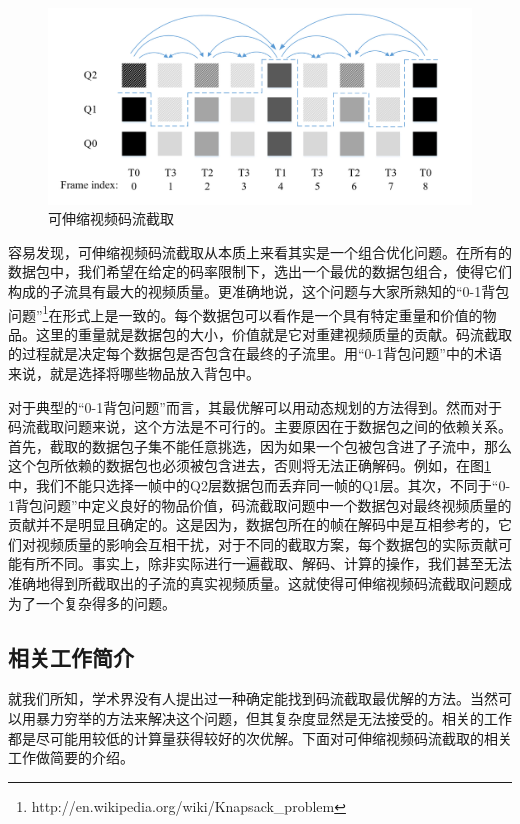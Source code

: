\begin{figure}[h]
\centering
\includegraphics[width = 0.9\linewidth]{./figures/Bitstream-Extraction.jpg}
\caption{可伸缩视频码流截取\label{fig:Bitstream-Extraction}}
\end{figure}

容易发现，可伸缩视频码流截取从本质上来看其实是一个组合优化问题。在所有的数据包中，我们希望在给定的码率限制下，选出一个最优的数据包组合，使得它们构成的子流具有最大的视频质量。更准确地说，这个问题与大家所熟知的“0-1背包问题”\footnote{http://en.wikipedia.org/wiki/Knapsack\_problem}在形式上是一致的。每个数据包可以看作是一个具有特定重量和价值的物品。这里的重量就是数据包的大小，价值就是它对重建视频质量的贡献。码流截取的过程就是决定每个数据包是否包含在最终的子流里。用“0-1背包问题”中的术语来说，就是选择将哪些物品放入背包中。

对于典型的“0-1背包问题”而言，其最优解可以用动态规划的方法得到。然而对于码流截取问题来说，这个方法是不可行的。主要原因在于数据包之间的依赖关系。首先，截取的数据包子集不能任意挑选，因为如果一个包被包含进了子流中，那么这个包所依赖的数据包也必须被包含进去，否则将无法正确解码。例如，在图\ref{fig:Bitstream-Extraction}中，我们不能只选择一帧中的Q2层数据包而丢弃同一帧的Q1层。其次，不同于“0-1背包问题”中定义良好的物品价值，码流截取问题中一个数据包对最终视频质量的贡献并不是明显且确定的。这是因为，数据包所在的帧在解码中是互相参考的，它们对视频质量的影响会互相干扰，对于不同的截取方案，每个数据包的实际贡献可能有所不同。事实上，除非实际进行一遍截取、解码、计算的操作，我们甚至无法准确地得到所截取出的子流的真实视频质量。这就使得可伸缩视频码流截取问题成为了一个复杂得多的问题。

\subsection{相关工作简介}

就我们所知，学术界没有人提出过一种确定能找到码流截取最优解的方法。当然可以用暴力穷举的方法来解决这个问题，但其复杂度显然是无法接受的。相关的工作都是尽可能用较低的计算量获得较好的次优解。下面对可伸缩视频码流截取的相关工作做简要的介绍。

